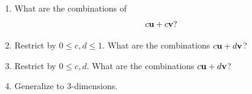 \begin{enumerate}
\begin{enumerate}
			\item What are the combinations of 
			\[ c{\bf u} + c {\bf v}?   \]  
			
			
			\item Restrict by $0 \le c,d \le 1$.  What are the combinations $c{\bf u} + d {\bf v}$? 
			
			
			\item Restrict by $0 \le c,d$.  What are the combinations $c{\bf u} + d {\bf v}$?   
			
			\item Generalize to 3-dimensions.
		\end{enumerate}

\end{enumerate}


 

